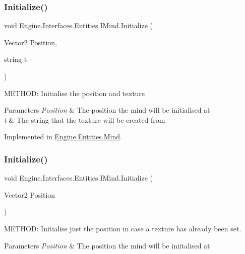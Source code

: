 \subsubsection{\texorpdfstring{Initialize()}{Initialize()}\hspace{0.1cm}{\footnotesize\ttfamily [1/2]}}
{\footnotesize\ttfamily void Engine.\+Interfaces.\+Entities.\+I\+Mind.\+Initialize (\begin{DoxyParamCaption}\item[{Vector2}]{Position,  }\item[{string}]{t }\end{DoxyParamCaption})}



M\+E\+T\+H\+OD\+: Initialise the position and texture 


\begin{DoxyParams}{Parameters}
{\em Position} & The position the mind will be initialised at\\
\hline
{\em t} & The string that the texture will be created from\\
\hline
\end{DoxyParams}


Implemented in \hyperlink{a00318_a386406a6250e4f7e59d0a048545ecc46}{Engine.\+Entities.\+Mind}.

\mbox{\label{a00446_a421d8eb0a0accda3320144fbfe33ea8c}} 
\subsubsection{\texorpdfstring{Initialize()}{Initialize()}\hspace{0.1cm}{\footnotesize\ttfamily [2/2]}}
{\footnotesize\ttfamily void Engine.\+Interfaces.\+Entities.\+I\+Mind.\+Initialize (\begin{DoxyParamCaption}\item[{Vector2}]{Position }\end{DoxyParamCaption})}



M\+E\+T\+H\+OD\+: Initialise just the position in case a texture has already been set. 


\begin{DoxyParams}{Parameters}
{\em Position} & The position the mind will be iniitalised at\\
\hline
\end{DoxyParams}


